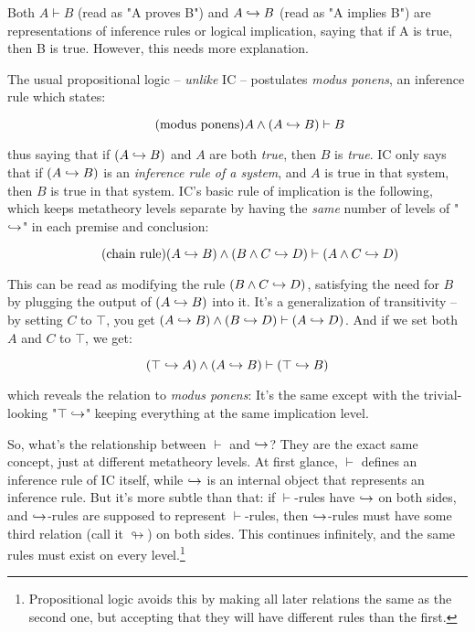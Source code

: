 \documentclass{article}
\begin{document}
  Both $A \vdash B$ (read as "A proves B") and $A \hookrightarrow B$ (read as "A implies B") are representations of inference rules or logical implication, saying that if A is true, then B is true. However, this needs more explanation.
  
  The usual propositional logic – \emph{unlike} IC – postulates \emph{modus ponens}, an inference rule which states:
  
  \begin{equation*}
    \tag{modus ponens}
    A \wedge (A \hookrightarrow B) \vdash B\\
  \end{equation*}
  
  thus saying that if $(A \hookrightarrow B)$ and $A$ are both \emph{true}, then $B$ is \emph{true}. IC only says that if $(A \hookrightarrow B)$ is an \emph{inference rule of a system}, and $A$ is true in that system, then $B$ is true in that system. IC's basic rule of implication is the following, which keeps metatheory levels separate by having the \emph{same} number of levels of "$\hookrightarrow$" in each premise and conclusion:
  
  \begin{equation*}
    \tag{chain rule}
    (A \hookrightarrow B) \wedge (B \wedge C \hookrightarrow D) \vdash (A \wedge C \hookrightarrow D)\\
  \end{equation*}
  
  This can be read as modifying the rule $(B \wedge C \hookrightarrow D)$, satisfying the need for $B$ by plugging the output of $(A \hookrightarrow B)$ into it. It's a generalization of transitivity – by setting $C$ to $\top$, you get $(A \hookrightarrow B) \wedge (B \hookrightarrow D) \vdash (A \hookrightarrow D)$. And if we set both $A$ and $C$ to $\top$, we get:
  
  \begin{equation*}
    (\top \hookrightarrow A) \wedge (A \hookrightarrow B) \vdash (\top \hookrightarrow B)\\
  \end{equation*}
  
  which reveals the relation to \emph{modus ponens}: It's the same except with the trivial-looking "$\top \hookrightarrow$" keeping everything at the same implication level.
  
  So, what's the relationship between $\vdash$ and $\hookrightarrow$? They are the exact same concept, just at different metatheory levels. At first glance, $\vdash$ defines an inference rule of IC itself, while $\hookrightarrow$ is an internal object that represents an inference rule. But it's more subtle than that: if $\vdash$-rules have $\hookrightarrow$ on both sides, and $\hookrightarrow$-rules are supposed to represent $\vdash$-rules, then $\hookrightarrow$-rules must have some third relation (call it $\looparrowright$) on both sides. This continues infinitely, and the same rules must exist on every level.\footnote{Propositional logic avoids this by making all later relations the same as the second one, but accepting that they will have different rules than the first.}
  
\end{document}
